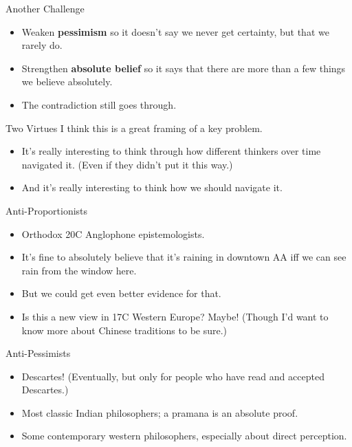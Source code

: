 \documentclass[
  17pt,
  letterpaper,
  ignorenonframetext,
  aspectratio=169,
  handout]{beamer}
\providecommand{\tightlist}{%
  \setlength{\itemsep}{0pt}\setlength{\parskip}{0pt}}\usepackage{longtable,booktabs,array}
\begin{document}
\begin{frame}{Another Challenge}
\protect\hypertarget{another-challenge}{}
\begin{itemize}[<+->]
\tightlist
\item
  Weaken \textbf{pessimism} so it doesn't say we never get certainty,
  but that we rarely do.
\item
  Strengthen \textbf{absolute belief} so it says that there are more
  than a few things we believe absolutely.
\item
  The contradiction still goes through.
\end{itemize}
\end{frame}

\begin{frame}{Two Virtues}
\protect\hypertarget{two-virtues}{}
I think this is a great framing of a key problem.

\begin{itemize}[<+->]
\tightlist
\item
  It's really interesting to think through how different thinkers over
  time navigated it. (Even if they didn't put it this way.)
\item
  And it's really interesting to think how we should navigate it.
\end{itemize}
\end{frame}

\begin{frame}{Anti-Proportionists}
\protect\hypertarget{anti-proportionists}{}
\begin{itemize}[<+->]
\tightlist
\item
  Orthodox 20C Anglophone epistemologists.
\item
  It's fine to absolutely believe that it's raining in downtown AA iff
  we can see rain from the window here.
\item
  But we could get even better evidence for that.
\item
  Is this a new view in 17C Western Europe? Maybe! (Though I'd want to
  know more about Chinese traditions to be sure.)
\end{itemize}
\end{frame}

\begin{frame}{Anti-Pessimists}
\protect\hypertarget{anti-pessimists}{}
\begin{itemize}[<+->]
\tightlist
\item
  Descartes! (Eventually, but only for people who have read and accepted
  Descartes.)
\item
  Most classic Indian philosophers; a pramana is an absolute proof.
\item
  Some contemporary western philosophers, especially about direct
  perception.
\end{itemize}
\end{frame}
\end{document}
